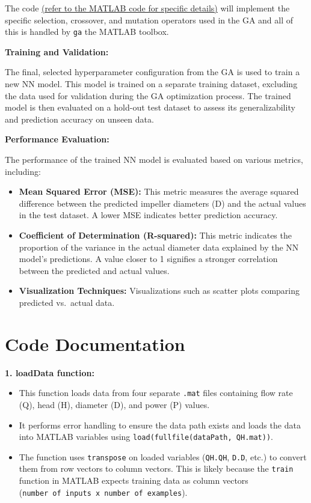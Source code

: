 \documentclass[
  super,
  review,
  3p]{elsarticle}
\providecommand{\tightlist}{%
  \setlength{\itemsep}{0pt}\setlength{\parskip}{0pt}}\usepackage{longtable,booktabs,array}
\begin{document}
The code
\href{https://github.com/MohammedTwheed/trimming-code/blob/main/trimming_code.m}{(refer
to the MATLAB code for specific details)} will implement the specific
selection, crossover, and mutation operators used in the GA and all of
this is handled by \texttt{ga} the MATLAB toolbox.

\textbf{Training and Validation:}

The final, selected hyperparameter configuration from the GA is used to
train a new NN model. This model is trained on a separate training
dataset, excluding the data used for validation during the GA
optimization process. The trained model is then evaluated on a hold-out
test dataset to assess its generalizability and prediction accuracy on
unseen data.

\textbf{Performance Evaluation:}

The performance of the trained NN model is evaluated based on various
metrics, including:

\begin{itemize}
\tightlist
\item
  \textbf{Mean Squared Error (MSE):} This metric measures the average
  squared difference between the predicted impeller diameters (D) and
  the actual values in the test dataset. A lower MSE indicates better
  prediction accuracy.
\item
  \textbf{Coefficient of Determination (R-squared):} This metric
  indicates the proportion of the variance in the actual diameter data
  explained by the NN model's predictions. A value closer to 1 signifies
  a stronger correlation between the predicted and actual values.
\item
  \textbf{Visualization Techniques:} Visualizations such as scatter
  plots comparing predicted vs.~actual data.
\end{itemize}

\section{Code Documentation}\label{code-documentation}

\textbf{1. loadData function:}

\begin{itemize}
\tightlist
\item
  This function loads data from four separate \texttt{.mat} files
  containing flow rate (Q), head (H), diameter (D), and power (P)
  values.
\item
  It performs error handling to ensure the data path exists and loads
  the data into MATLAB variables using
  \texttt{load(fullfile(dataPath,\ \textquotesingle{}QH.mat\textquotesingle{}))}.
\item
  The function uses \texttt{transpose} on loaded variables
  (\texttt{QH.QH}, \texttt{D.D}, etc.) to convert them from row vectors
  to column vectors. This is likely because the \texttt{train} function
  in MATLAB expects training data as column vectors
  (\texttt{number\ of\ inputs\ x\ number\ of\ examples}).
\end{itemize}
\end{document}
